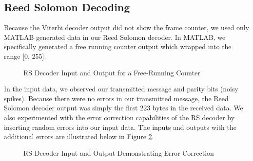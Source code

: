 \documentclass[conference,onecolumn]{IEEEtran}
\begin{document}
\subsection{Reed Solomon Decoding}

Because the Viterbi decoder output did not show the frame counter, we used only MATLAB generated data in our Reed Solomon decoder. In MATLAB, we specifically generated a free running counter output which wrapped into the range [0, 255].

\begin{figure}[H]
	\centerline{}
	\caption{RS Decoder Input and Output for a Free-Running Counter}
	\label{fig::RS_decoder_output}
\end{figure}

In the input data, we observed our transmitted message and parity bits (noisy spikes). Because there were no errors in our transmitted message, the Reed Solomon decoder output was simply the first 223 bytes in the received data. We also experimented with the error correction capabilities of the RS decoder by inserting random errors into our input data. The inputs and outputs with the additional errors are illustrated below in Figure \ref{fig::RS_decoder_output_errors}.

\begin{figure}[H]
	\centerline{}
	\caption{RS Decoder Input and Output Demonstrating Error Correction}
	\label{fig::RS_decoder_output_errors}
\end{figure}
\end{document}
